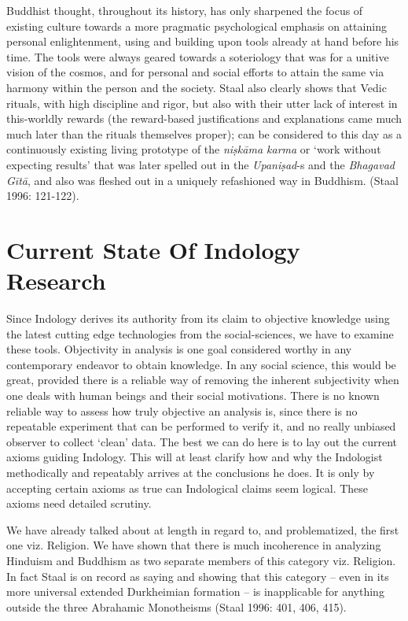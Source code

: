 Buddhist thought, throughout its history, has only sharpened the focus of existing culture towards a more pragmatic psychological emphasis on attaining personal enlightenment, using and building upon tools already at hand before his time. The tools were always geared towards a soteriology that was for a unitive vision of the cosmos, and for personal and social efforts to attain the same via harmony within the person and the society. Staal also clearly shows that Vedic rituals, with high discipline and rigor, but also with their utter lack of interest in this-worldly rewards (the reward-based justifications and explanations came much much later than the rituals themselves proper); can be considered to this day as a continuously existing living prototype of the \textit{niṣkāma karma} or ‘work without expecting results’ that was later spelled out in the \textit{Upaniṣad}-s and the \textit{Bhagavad Gītā}, and also was fleshed out in a uniquely refashioned way in Buddhism. (Staal 1996: 121-122).


\section*{Current State Of Indology Research}

Since Indology derives its authority from its claim to objective knowledge using the latest cutting edge technologies from the social-sciences, we have to examine these tools. Objectivity in analysis is one goal considered worthy in any contemporary endeavor to obtain knowledge. In any social science, this would be great, provided there is a reliable way of removing the inherent subjectivity when one deals with human beings and their social motivations. There is no known reliable way to assess how truly objective an analysis is, since there is no repeatable experiment that can be performed to verify it, and no really unbiased observer to collect ‘clean’ data. The best we can do here is to lay out the current axioms guiding Indology. This will at least clarify how and why the Indologist methodically and repeatably arrives at the conclusions he does. It is only by accepting certain axioms as true can Indological claims seem logical. These axioms need detailed scrutiny.

We have already talked about at length in regard to, and problematized, the first one viz. Religion. We have shown that there is much incoherence in analyzing Hinduism and Buddhism as two separate members of this category viz. Religion. In fact Staal is on record as saying and showing that this category – even in its more universal extended Durkheimian formation – is inapplicable for anything outside the three Abrahamic Monotheisms (Staal 1996: 401, 406, 415).


